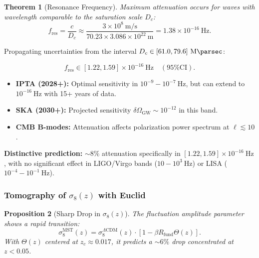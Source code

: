 \documentclass[11pt, a4paper]{article}
\theoremstyle{plain}
\newtheorem{theorem}{Theorem}[section]
\newtheorem{proposition}[theorem]{Proposition}
\theoremstyle{definition}
\newcommand{\Rfactor}{R_{\text{fund}}}
\begin{document}
\begin{theorem}[Resonance Frequency]
Maximum attenuation occurs for waves with wavelength comparable to the saturation scale $D_c$:
\begin{equation}
f_{\text{res}} = \frac{c}{D_c} \approx \frac{3\times 10^8\ \si{\meter\per\second}}{70.23 \times 3.086\times 10^{22}\ \si{\meter}} = 1.38 \times 10^{-16}\ \si{\hertz}.
\end{equation}
\end{theorem}

Propagating uncertainties from the interval $D_c \in [61.0, 79.6]\ \si{\mega\parsec}$:

\begin{equation}
f_{\text{res}} \in [1.22, 1.59] \times 10^{-16}\ \si{\hertz} \quad (\text{95\% CI}).
\end{equation}

\begin{itemize}
    \item \textbf{IPTA (2028+):} Optimal sensitivity in $10^{-9}-10^{-7}\ \si{\hertz}$, but can extend to $10^{-16}\ \si{\hertz}$ with 15+ years of data.
    \item \textbf{SKA (2030+):} Projected sensitivity $\delta\Omega_{\text{GW}} \sim 10^{-12}$ in this band.
    \item \textbf{CMB B-modes:} Attenuation affects polarization power spectrum at $\ell \lesssim 10$.
\end{itemize}

\textbf{Distinctive prediction:} $\sim 8\%$ attenuation specifically in $[1.22, 1.59] \times 10^{-16}\ \si{\hertz}$, with no significant effect in LIGO/Virgo bands ($10-10^3\ \si{\hertz}$) or LISA ($10^{-4}-10^{-1}\ \si{\hertz}$).

\subsubsection{Tomography of \texorpdfstring{$\sigma_8(z)$}{σ8(z)} with Euclid}

\begin{proposition}[Sharp Drop in $\sigma_8(z)$]
The fluctuation amplitude parameter shows a rapid transition:
\begin{equation}
\sigma_8^{\text{MST}}(z) = \sigma_8^{\Lambda\text{CDM}}(z) \cdot \left[1 - \beta\Rfactor \Theta(z)\right].
\end{equation}
With $\Theta(z)$ centered at $z_c \approx 0.017$, it predicts a $\sim 6\%$ drop concentrated at $z < 0.05$.
\end{proposition}
\end{document}
